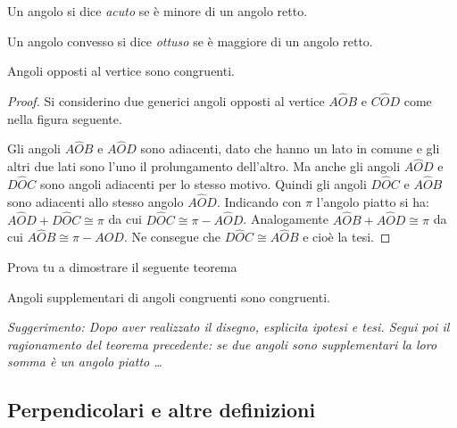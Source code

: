 \begin{definizione}
Un angolo si dice \emph{acuto} se è minore di un angolo retto.
\end{definizione}

\begin{definizione}
Un angolo convesso si dice \emph{ottuso} se è maggiore di un angolo retto.
\end{definizione}

\begin{figure}[htb]
\centering
\end{figure}

\begin{teorema}
Angoli opposti al vertice sono congruenti.
\end{teorema}

\begin{proof}
Si considerino due generici angoli opposti al vertice $A\widehat{O}B$ e $C\widehat{O}D$ come nella figura seguente.
\begin{figure}[htb]
\centering
\end{figure}
Gli angoli $A\widehat{O}B$ e $A\widehat{O}D$ sono adiacenti, dato che hanno un lato in comune e gli altri due lati sono l'uno il prolungamento dell'altro. Ma anche gli angoli $A\widehat{O}D$ e $D\widehat{O}C$ sono angoli adiacenti per lo stesso motivo. Quindi gli angoli $D\widehat{O}C$ e $A\widehat{O}B$ sono adiacenti allo stesso angolo $A\widehat{O}D$.
Indicando con $\pi$ l'angolo piatto si ha: $A\widehat{O}D + D\widehat{O}C \cong \pi$ da cui $D\widehat{O}C\cong \pi - A\widehat{O}D$. Analogamente $A\widehat{O}B+A\widehat{O}D\cong\pi$ da cui $A\widehat{O}B\cong \pi-A\widehat{O}D$. Ne consegue che $D\widehat{O}C\cong A\widehat{O}B$ e cioè la tesi.
\end{proof}

Prova tu a dimostrare il seguente teorema

\begin{teorema}
Angoli supplementari di angoli congruenti sono congruenti.
\end{teorema}

\emph{Suggerimento: Dopo aver realizzato il disegno, esplicita ipotesi e tesi. Segui poi il ragionamento del teorema precedente: se due angoli sono supplementari la loro somma è un angolo piatto \ldots{}}

\subsection{Perpendicolari e altre definizioni}

